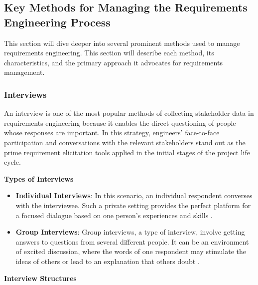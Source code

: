\documentclass[conference]{IEEEtran}
\begin{document}
\subsection{Key Methods for Managing the Requirements Engineering Process}

This section will dive deeper into several prominent methods used to manage requirements engineering. This section will describe each method, its characteristics, and the primary approach it advocates for requirements management.

\subsubsection{Interviews}

An interview is one of the most popular methods of collecting stakeholder data in requirements engineering because it enables the direct questioning of people whose responses are important. In this strategy, engineers’ face-to-face participation and conversations with the relevant stakeholders stand out as the prime requirement elicitation tools applied in the initial stages of the project life cycle.

\textbf{Types of Interviews}

\begin{itemize}
    \item \textbf{Individual Interviews}: In this scenario, an individual respondent converses with the interviewee. Such a private setting provides the perfect platform for a focused dialogue based on one person’s experiences and skills \cite{cite7}.
    \item \textbf{Group Interviews}: Group interviews, a type of interview, involve getting answers to questions from several different people. It can be an environment of excited discussion, where the words of one respondent may stimulate the ideas of others or lead to an explanation that others doubt \cite{cite7}.
\end{itemize}

\textbf{Interview Structures}
\end{document}

